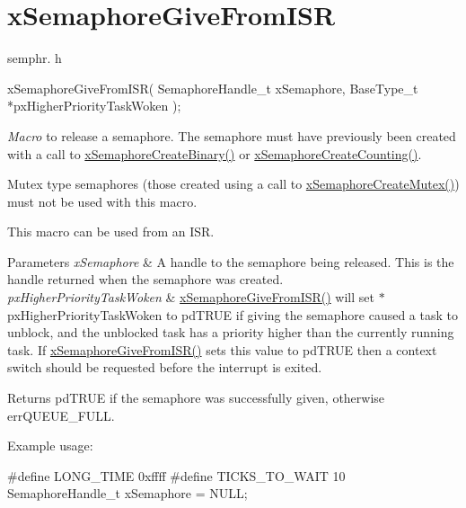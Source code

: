 \hypertarget{group__x_semaphore_give_from_i_s_r}{}\section{x\+Semaphore\+Give\+From\+I\+SR}
\label{group__x_semaphore_give_from_i_s_r}
semphr. h 
\begin{DoxyPre}
  xSemaphoreGiveFromISR(
                         SemaphoreHandle\_t xSemaphore,
                         BaseType\_t *pxHigherPriorityTaskWoken
                     );
  \end{DoxyPre}


{\itshape Macro} to release a semaphore. The semaphore must have previously been created with a call to \hyperlink{vendor_2ceedling_2plugins_2freertos_2src_2freertos_2include_2semphr_8h_acba963695e4f159d9bfa2394cae5badc}{x\+Semaphore\+Create\+Binary()} or \hyperlink{vendor_2ceedling_2plugins_2freertos_2src_2freertos_2include_2semphr_8h_a7764616a918a46115403569a88148ad4}{x\+Semaphore\+Create\+Counting()}.

Mutex type semaphores (those created using a call to \hyperlink{vendor_2ceedling_2plugins_2freertos_2src_2freertos_2include_2semphr_8h_aa6a00aa9b91a9e5b3ebe4ae1c3f115c6}{x\+Semaphore\+Create\+Mutex()}) must not be used with this macro.

This macro can be used from an I\+SR.


\begin{DoxyParams}{Parameters}
{\em x\+Semaphore} & A handle to the semaphore being released. This is the handle returned when the semaphore was created.\\
\hline
{\em px\+Higher\+Priority\+Task\+Woken} & \hyperlink{vendor_2ceedling_2plugins_2freertos_2src_2freertos_2include_2semphr_8h_a68aa43df8b2a0dbe17d05fad74670ef0}{x\+Semaphore\+Give\+From\+I\+S\+R()} will set $\ast$px\+Higher\+Priority\+Task\+Woken to pd\+T\+R\+UE if giving the semaphore caused a task to unblock, and the unblocked task has a priority higher than the currently running task. If \hyperlink{vendor_2ceedling_2plugins_2freertos_2src_2freertos_2include_2semphr_8h_a68aa43df8b2a0dbe17d05fad74670ef0}{x\+Semaphore\+Give\+From\+I\+S\+R()} sets this value to pd\+T\+R\+UE then a context switch should be requested before the interrupt is exited.\\
\hline
\end{DoxyParams}
\begin{DoxyReturn}{Returns}
pd\+T\+R\+UE if the semaphore was successfully given, otherwise err\+Q\+U\+E\+U\+E\+\_\+\+F\+U\+LL.
\end{DoxyReturn}
Example usage\+: 
\begin{DoxyPre}
\#define LONG\_TIME 0xffff
\#define TICKS\_TO\_WAIT 10
  SemaphoreHandle\_t xSemaphore = NULL;\end{DoxyPre}



